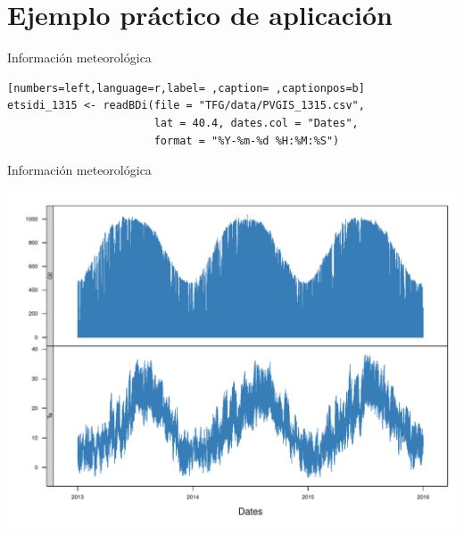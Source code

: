 \documentclass[aspectratio=169, usenames,svgnames,dvipsnames]{beamer}
\begin{document}
\section{Ejemplo práctico de aplicación}
\label{sec:org48e2126}
\begin{frame}[label={sec:org83fec4d},fragile]{Información meteorológica}
 \begin{lstlisting}[numbers=left,language=r,label= ,caption= ,captionpos=b]
etsidi_1315 <- readBDi(file = "TFG/data/PVGIS_1315.csv",
                       lat = 40.4, dates.col = "Dates",
                       format = "%Y-%m-%d %H:%M:%S")
\end{lstlisting}
\end{frame}

\begin{frame}[label={sec:orga168ce6}]{Información meteorológica}
\begin{center}
\includegraphics[height=0.9\textheight]{../figuras/ejemplos3.pdf}
\end{center}
\end{frame}
\end{document}
